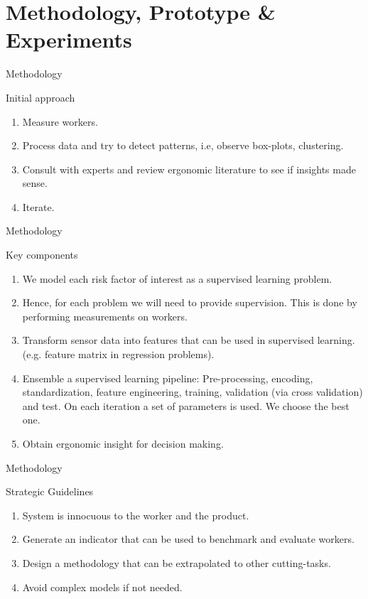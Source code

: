 \section{Methodology, Prototype \& Experiments}
\frame{\sectionpage}


\begin{frame}{Methodology}
    \begin{alertblock}{Initial approach}
        \begin{enumerate}
            \item Measure workers.
            \item Process data and try to detect patterns, i.e, observe box-plots, clustering.
            \item Consult with experts and review ergonomic literature to see if insights made sense.
            \item Iterate.
        \end{enumerate}
    \end{alertblock}
\end{frame}


\begin{frame}{Methodology}
    \begin{alertblock}{Key components}
        \begin{enumerate}
            \item We model each risk factor of interest as a supervised learning problem.
            \item Hence, for each problem we will need to provide supervision. This is done by performing measurements on workers.
            \item Transform sensor data into features that can be used in supervised learning. (e.g. feature matrix in regression problems).
            \item Ensemble a supervised learning pipeline: Pre-processing, encoding, standardization, feature engineering, training, validation (via cross validation) and test. On each
            iteration a set of parameters is used. We choose the best one.
            \item Obtain ergonomic insight for decision making.
        \end{enumerate}
    \end{alertblock}
\end{frame}

\begin{frame}{Methodology}
    \begin{alertblock}{Strategic Guidelines}
        \begin{enumerate}
            \item System is innocuous to the worker and the product.
            \item Generate an indicator that can be used to benchmark and evaluate workers.
            \item Design a methodology that can be extrapolated to other cutting-tasks.
            \item Avoid complex models if not needed.
        \end{enumerate}
    \end{alertblock}
\end{frame}



